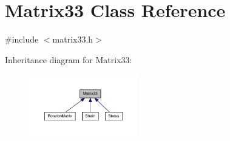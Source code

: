 \hypertarget{classMatrix33}{\section{\-Matrix33 \-Class \-Reference}
\label{de/d82/classMatrix33}
}


{\ttfamily \#include $<$matrix33.\-h$>$}



\-Inheritance diagram for \-Matrix33\-:
\nopagebreak
\begin{figure}[H]
\begin{center}
\leavevmode
\includegraphics[width=134pt]{dc/dfe/classMatrix33__inherit__graph}
\end{center}
\end{figure}
